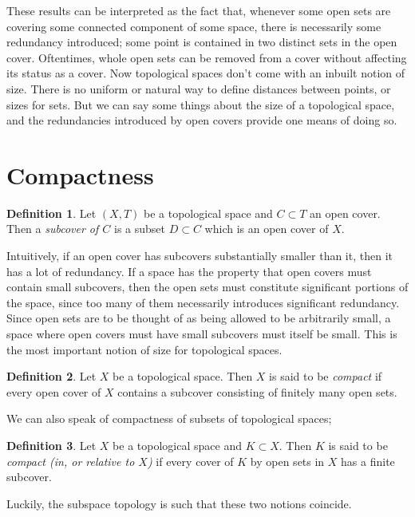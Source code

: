 \documentclass{book}
\theoremstyle{definition}
\newtheorem{definition}{Definition}[section]
\theoremstyle{remark}
\begin{document}
These results can be interpreted as the fact that, whenever some open sets are covering some connected component of some space, there is necessarily some redundancy introduced; some point is contained in two distinct sets in the open cover. Oftentimes, whole open sets can be removed from a cover without affecting its status as a cover. Now topological spaces don't come with an inbuilt notion of size. There is no uniform or natural way to define distances between points, or sizes for sets. But we can say some things about the size of a topological space, and the redundancies introduced by open covers provide one means of doing so.

\section{Compactness}
\begin{definition}
Let $(X,T)$ be a topological space and $C\subset T$ an open cover. Then a \textit{subcover of $C$} is a subset $D\subset C$ which is an open cover of $X$.
\end{definition}

Intuitively, if an open cover has subcovers substantially smaller than it, then it has a lot of redundancy. If a space has the property that open covers must contain small subcovers, then the open sets must constitute significant portions of the space, since too many of them necessarily introduces significant redundancy. Since open sets are to be thought of as being allowed to be arbitrarily small, a space where open covers must have small subcovers must itself be small. This is the most important notion of size for topological spaces.

\begin{definition}
Let $X$ be a topological space. Then $X$ is said to be \textit{compact} if every open cover of $X$ contains a subcover consisting of finitely many open sets.
\end{definition}

We can also speak of compactness of subsets of topological spaces;

\begin{definition}
Let $X$ be a topological space and $K\subset X$. Then $K$ is said to be \textit{compact (in, or relative to $X$)} if every cover of $K$ by open sets in $X$ has a finite subcover.
\end{definition}

Luckily, the subspace topology is such that these two notions coincide.
\end{document}
